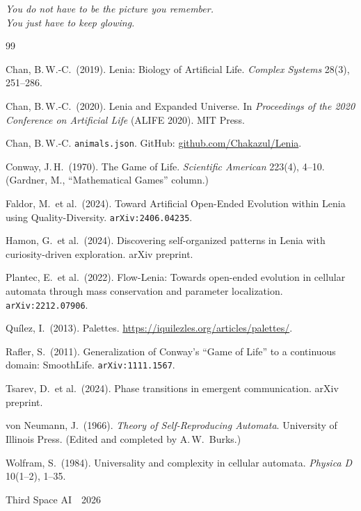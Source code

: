 \documentclass[11pt,a4paper]{article}
\begin{document}
\vspace{6pt}
\begin{center}
\itshape\color{accent}
You do not have to be the picture you remember.\\
You just have to keep glowing.
\end{center}

\begin{thebibliography}{99}
\small

Chan, B.\,W.-C.\ (2019).
\newblock Lenia: Biology of Artificial Life.
\newblock \textit{Complex Systems} 28(3), 251--286.

Chan, B.\,W.-C.\ (2020).
\newblock Lenia and Expanded Universe.
\newblock In \textit{Proceedings of the 2020 Conference on Artificial Life}
  (ALIFE 2020). MIT Press.

Chan, B.\,W.-C.
\newblock \texttt{animals.json}. GitHub: \url{github.com/Chakazul/Lenia}.

Conway, J.\,H.\ (1970).
\newblock The Game of Life. \textit{Scientific American} 223(4), 4--10.
  (Gardner, M., ``Mathematical Games'' column.)

Faldor, M.\ et al.\ (2024).
\newblock Toward Artificial Open-Ended Evolution within Lenia using
  Quality-Diversity. \texttt{arXiv:2406.04235}.

Hamon, G.\ et al.\ (2024).
\newblock Discovering self-organized patterns in Lenia with
  curiosity-driven exploration. arXiv preprint.

Plantec, E.\ et al.\ (2022).
\newblock Flow-Lenia: Towards open-ended evolution in cellular automata
  through mass conservation and parameter localization.
\newblock \texttt{arXiv:2212.07906}.

Quílez, I.\ (2013).
\newblock Palettes. \url{https://iquilezles.org/articles/palettes/}.

Rafler, S.\ (2011).
\newblock Generalization of Conway's ``Game of Life'' to a continuous
  domain: SmoothLife. \texttt{arXiv:1111.1567}.

Tsarev, D.\ et al.\ (2024).
\newblock Phase transitions in emergent communication. arXiv preprint.

von Neumann, J.\ (1966).
\newblock \textit{Theory of Self-Reproducing Automata}.
\newblock University of Illinois Press. (Edited and completed by A.\,W.\ Burks.)

Wolfram, S.\ (1984).
\newblock Universality and complexity in cellular automata.
\newblock \textit{Physica D} 10(1--2), 1--35.

\end{thebibliography}

\vspace{18pt}
\begin{center}
\sffamily\footnotesize\color{muted}
Third Space AI \,\textperiodcentered\, 2026
\end{center}
\end{document}
